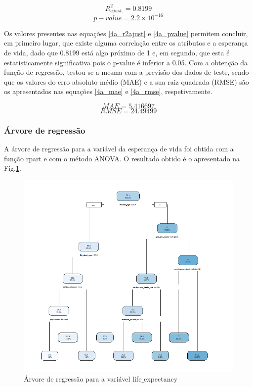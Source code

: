 \documentclass[conference]{IEEEtran}
\begin{document}
\begin{equation}
R^{2}_{ajust.} = 0.8199\label{4a_r2ajust}
\end{equation}
\begin{equation}
p-value = 2.2\times 10^{-16}\label{4a_pvalue}
\end{equation}

Os valores presentes nas equações \eqref{4a_r2ajust} e \eqref{4a_pvalue} permitem concluir, em primeiro lugar, que existe alguma correlação entre os atributos e a esperança de vida, dado que 0.8199 está algo próximo de 1 e, em segundo, que esta é estatisticamente significativa pois o p-value é inferior a 0.05.
Com a obtenção da função de regressão, testou-se a mesma com a previsão dos dados de teste, sendo que os valores do erro absoluto médio (MAE) e a sua raiz quadrada (RMSE) são os apresentados nas equações \eqref{4a_mae} e \eqref{4a_rmse}, respetivamente.

\begin{equation}
MAE=5.416697\label{4a_mae}
\end{equation}
\begin{equation}
RMSE=24.49499\label{4a_rmse}
\end{equation}


\subsubsection{Árvore de regressão}
A árvore de regressão para a variável da esperança de vida foi obtida com a função rpart e com o método ANOVA. O resultado obtido é o apresentado na Fig.\ref{4b}.

\begin{figure}[htbp]
\centerline{\includegraphics[width=0.95\columnwidth]{images/04_2.png}}
\caption{Árvore de regressão para a variável life$\_$expectancy}
\label{4b}
\end{figure}
\end{document}
